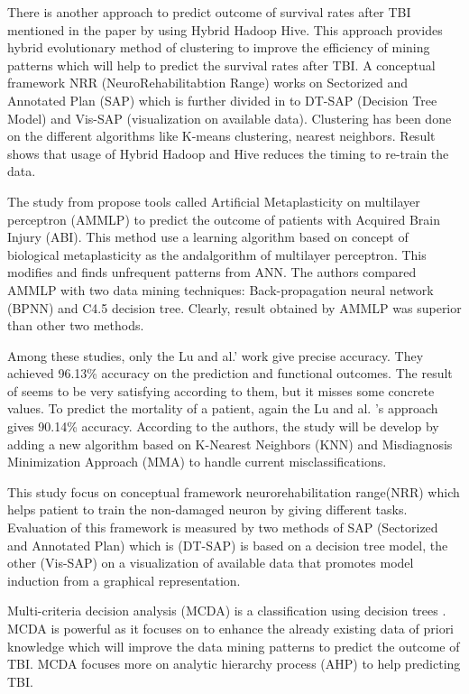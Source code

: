 \documentclass[runningheads]{llncs}
\begin{document}
There is another approach to predict outcome of survival rates after TBI  mentioned in the paper \cite{rodger_discovery_2015} by using Hybrid Hadoop Hive. This approach provides hybrid evolutionary method of clustering to improve the efficiency of mining patterns which will help to predict the survival rates after TBI. A conceptual framework NRR (NeuroRehabilitabtion Range) works on Sectorized and Annotated Plan (SAP) which is further divided in to DT-SAP (Decision Tree Model) and Vis-SAP (visualization on available data).\cite{garcia-rudolph_data_2014} Clustering has been done on the different algorithms like  K-means clustering, nearest neighbors. Result shows that usage of Hybrid Hadoop and Hive reduces the timing to re-train the data. 

The study from \cite{marcano-cedeno_artificial_2013} propose tools called Artificial Metaplasticity on multilayer perceptron (AMMLP) to predict the outcome of patients with Acquired Brain Injury (ABI). This method use a learning algorithm based on concept of biological metaplasticity as the andalgorithm of multilayer perceptron. This modifies and finds unfrequent patterns from ANN. The authors compared AMMLP with two data mining techniques: Back-propagation neural network (BPNN) and C4.5 decision tree. Clearly, result obtained by AMMLP was superior than other two methods.

Among these studies, only the Lu and al.' \cite{lu_predicting_2015} work give precise accuracy. They achieved 96.13\% accuracy on the prediction and functional outcomes. The result of \cite{siddiqui_predicting_2015} seems to be very satisfying according to them, but it misses some concrete values.
To predict the mortality of a patient, again the Lu and al. \cite{lu_predicting_2015} 's approach gives 90.14\% accuracy. According to the authors, the study \cite{rodger_neurois_2015} will be develop by adding a new algorithm based on K-Nearest Neighbors (KNN) and Misdiagnosis Minimization Approach (MMA) to handle current misclassifications.

This study \cite{garcia-rudolph_data_2014} focus on conceptual framework neurorehabilitation range(NRR) which helps patient to train the non-damaged neuron by giving different tasks. Evaluation of this framework is measured by two methods of SAP (Sectorized and Annotated Plan) which is (DT-SAP) is based on a decision tree model, the other (Vis-SAP) on a visualization of available data that promotes model induction from a graphical representation.

Multi-criteria decision analysis (MCDA) is a classification using decision trees \cite{niki_kunene_approach_2008}. MCDA is powerful as it focuses on to enhance the already existing data of priori knowledge which will improve the data mining patterns to predict the outcome of TBI. MCDA focuses more on analytic hierarchy process (AHP) to help predicting TBI. \cite{niki_kunene_approach_2008}
\end{document}
